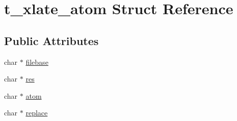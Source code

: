 \hypertarget{structt__xlate__atom}{\section{t\-\_\-xlate\-\_\-atom \-Struct \-Reference}
\label{structt__xlate__atom}
}
\subsection*{\-Public \-Attributes}
\begin{DoxyCompactItemize}
\item 
char $\ast$ \hyperlink{structt__xlate__atom_a49e115b80cf09d3efa18cae77de0306c}{filebase}
\item 
char $\ast$ \hyperlink{structt__xlate__atom_ab62cb66a5ddcdd9c553829070957141c}{res}
\item 
char $\ast$ \hyperlink{structt__xlate__atom_ab00c2b1487a1af963570d9c6fd1472f7}{atom}
\item 
char $\ast$ \hyperlink{structt__xlate__atom_afd321d8ee8e29587b3847544f224bce1}{replace}
\end{DoxyCompactItemize}


